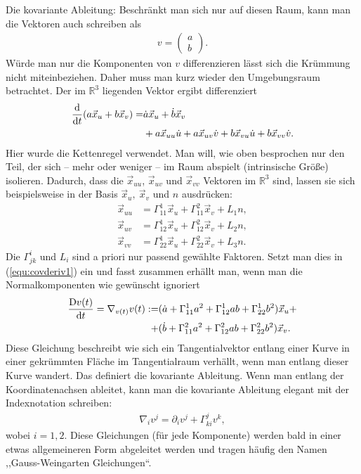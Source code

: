\documentclass{scrartcl}
\newcommand{\vx}{\vec{x}}
\begin{document}
\begin{paragraph}{Die kovariante Ableitung:}
			Beschränkt man sich nur auf diesen Raum, kann man
			die Vektoren auch schreiben als
			\begin{align}
				v=\left(\begin{array}{c} a \\ b\end{array}\right).
			\end{align}
			Würde man nur die Komponenten von $v$ differenzieren lässt sich die Krümmung nicht miteinbeziehen. Daher muss man kurz wieder den Umgebungsraum
			betrachtet.
			Der im $\mathbb{R}^3$ liegenden Vektor ergibt differenziert
			\begin{align}
				\frac{{\rm d}}{{\rm d}t}(a\vec{x}_u+b\vec{x}_v)=&\dot{a}\vec{x}_u+\dot{b}\vec{x}_v\notag\\
				&+a\vec{x}_{uu}\dot{u}+a\vec{x}_{uv}\dot{v}+b\vec{x}_{vu}\dot{u}+b\vec{x}_{vv}\dot{v}.
				\label{equ:covderiv1}
			\end{align}
			Hier wurde die Kettenregel verwendet.
			Man will, wie oben besprochen nur den Teil, der sich -- mehr oder weniger -- im Raum abspielt (intrinsische Größe) isolieren. Dadurch, dass die 
			$\vec{x}_{uu}$, $\vec{x}_{uv}$ und $\vec{x}_{vv}$ Vektoren im $\mathbb{R}^3$ sind, lassen sie sich beispielsweise in der Basis $\vec{x}_{u},\ \vec{x}_{v}$
			und $n$ ausdrücken:
			\begin{align}
				\vec{x}_{uu}&=\Gamma^1_{11} \vx_u+\Gamma^2_{11}\vx_v+L_1 n,\\
				\vx_{uv}&=\Gamma^1_{12}\vx_u+\Gamma^2_{12}\vx_v +L_2 n,\\
				\vx_{vv}&=\Gamma^1_{22}\vx_u+\Gamma^2_{22}\vx_v+L_3 n.
			\end{align}
			Die $\Gamma^i_{jk}$ und $L_i$ sind a priori nur passend gewählte Faktoren.
			Setzt man dies in (\ref{equ:covderiv1}) ein und fasst zusammen erhällt man, wenn man die Normalkomponenten wie gewünscht ignoriert 
			\begin{align}
				\frac{{\rm D} v(t)}{{\rm d}t}=\nabla_{v(t)} v(t) :=& (\dot{a} + \Gamma^1_{11}a^2+\Gamma^1_{12}ab+\Gamma^1_{22}b^2)\vx_u+\notag\\
				+&(\dot{b} + \Gamma^2_{11}a^2+\Gamma^2_{12}ab+\Gamma^2_{22}b^2)\vx_v.
			\end{align}
			Diese Gleichung beschreibt wie sich ein Tangentialvektor entlang einer Kurve in einer gekrümmten Fläche im Tangentialraum verhällt, wenn man entlang dieser Kurve wandert.
			Das definiert die kovariante Ableitung. Wenn man entlang der Koordinatenachsen ableitet, kann man die kovariante Ableitung elegant mit der Indexnotation
			schreiben:
			\begin{align}
				\nabla_i v^j=\partial_i v^j + \Gamma^j_{ki}v^k,
			\end{align}
			wobei $i=1,2$. Diese Gleichungen (für jede Komponente) werden bald in einer etwas allgemeineren Form abgeleitet werden und tragen häufig den Namen ,,Gauss-Weingarten Gleichungen``.
		\end{paragraph}
\end{document}
